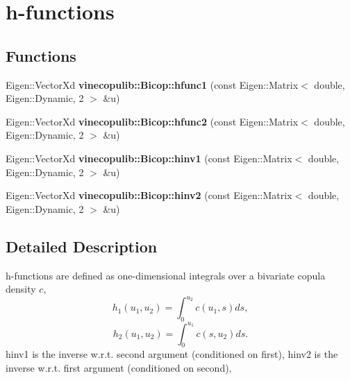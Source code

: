 \hypertarget{group__hfunctions}{}\section{h-\/functions}
\label{group__hfunctions}
\subsection*{Functions}
\begin{DoxyCompactItemize}
\item 
Eigen\+::\+Vector\+Xd {\bfseries vinecopulib\+::\+Bicop\+::hfunc1} (const Eigen\+::\+Matrix$<$ double, Eigen\+::\+Dynamic, 2 $>$ \&u)\hypertarget{group__hfunctions_ga130fda62cd61c7acdef5db75fffdd89e}{}\label{group__hfunctions_ga130fda62cd61c7acdef5db75fffdd89e}

\item 
Eigen\+::\+Vector\+Xd {\bfseries vinecopulib\+::\+Bicop\+::hfunc2} (const Eigen\+::\+Matrix$<$ double, Eigen\+::\+Dynamic, 2 $>$ \&u)\hypertarget{group__hfunctions_ga4c9b50f99797ec374f5057cc54db2bd8}{}\label{group__hfunctions_ga4c9b50f99797ec374f5057cc54db2bd8}

\item 
Eigen\+::\+Vector\+Xd {\bfseries vinecopulib\+::\+Bicop\+::hinv1} (const Eigen\+::\+Matrix$<$ double, Eigen\+::\+Dynamic, 2 $>$ \&u)\hypertarget{group__hfunctions_ga3cc8b161ec6efdb3b34d2efa9185bf44}{}\label{group__hfunctions_ga3cc8b161ec6efdb3b34d2efa9185bf44}

\item 
Eigen\+::\+Vector\+Xd {\bfseries vinecopulib\+::\+Bicop\+::hinv2} (const Eigen\+::\+Matrix$<$ double, Eigen\+::\+Dynamic, 2 $>$ \&u)\hypertarget{group__hfunctions_ga3e33ec227b6b7182e327399201cad382}{}\label{group__hfunctions_ga3e33ec227b6b7182e327399201cad382}

\end{DoxyCompactItemize}


\subsection{Detailed Description}
h-\/functions are defined as one-\/dimensional integrals over a bivariate copula density $ c $, \[ h_1(u_1, u_2) = \int_0^{u_2} c(u_1, s) ds, \] \[ h_2(u_1, u_2) = \int_0^{u_1} c(s, u_2) ds. \] {\ttfamily hinv1} is the inverse w.\+r.\+t. second argument (conditioned on first), {\ttfamily hinv2} is the inverse w.\+r.\+t. first argument (conditioned on second),

